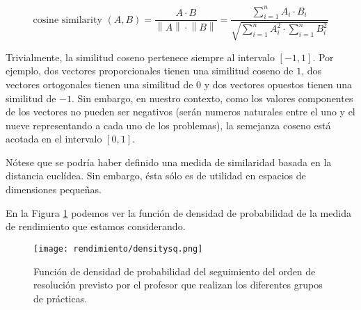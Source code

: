 \begin{equation}
\text{cosine similarity }(A,B) = \frac{A\cdot B}{\left\lVert A \right\rVert \cdot \left\lVert B \right\rVert} = \frac{\sum_{i=1}^n {A_i \cdot B_i}}{\sqrt{\sum_{i=1}^n{A_i^2} \cdot \sum_{i=1}^n {B_i^2}}}
\label{eq:cosinesimilarity}
\end{equation}

Trivialmente, la similitud coseno pertenece siempre al intervalo $[-1,1]$. Por ejemplo, dos vectores proporcionales tienen una similitud coseno de $1$, dos vectores ortogonales tienen una similitud de $0$ y dos vectores opuestos tienen una similitud de $-1$. Sin embargo, en nuestro contexto, como los valores componentes de los vectores no pueden ser negativos (serán numeros naturales entre el uno y el nueve representando a cada uno de los problemas), la semejanza coseno está acotada en el intervalo $[0,1]$.

Nótese que se podría haber definido una medida de similaridad basada en la distancia euclídea. Sin embargo, ésta sólo es de utilidad en espacios de dimensiones pequeñas.

En la Figura \ref{fig:densityplotsq} podemos ver la función de densidad de probabilidad de la medida de rendimiento que estamos considerando.

\begin{figure}[H]
    \centering
    \texttt{[image: rendimiento/densitysq.png]}
    \caption{Función de densidad de probabilidad del seguimiento del orden de resolución previsto por el profesor que realizan los diferentes grupos de prácticas.}
    \label{fig:densityplotsq}
\end{figure}